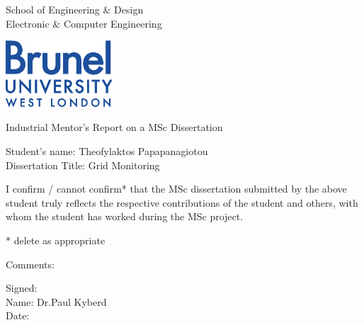 \newpage
\thispagestyle{empty}
\begin{center}
\Large
School of Engineering \& Design\\
Electronic \& Computer Engineering\\
\vspace{0.5\baselineskip}
\begin{center}
\includegraphics[width=40mm]{images/brunel_logo.eps}\\
\end{center}
\Large
Industrial Mentor's Report on a MSc Dissertation\\
\end{center}
\Large
\vspace{0.5\baselineskip}
Student's name: Theofylaktos Papapanagiotou
\\
Dissertation Title: Grid Monitoring

\vspace{0.5\baselineskip}
\large
\noindent

I confirm / cannot confirm* that the MSc dissertation submitted by the above student truly reflects the respective contributions of the student and others, with whom the student has worked during the MSc project.

\vspace{0.5\baselineskip}
$*$ delete as appropriate

\vspace{1\baselineskip}
Comments:


\vspace{2.5\baselineskip}
\noindent
Signed:\\
Name: Dr.Paul Kyberd\\
Date:
